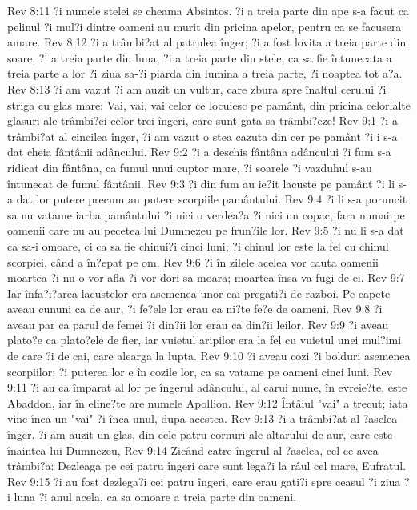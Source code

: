 Rev 8:11  ?i numele stelei se cheama Absintos. ?i a treia parte din ape s-a facut ca pelinul ?i mul?i dintre oameni au murit din pricina apelor, pentru ca se facusera amare.
Rev 8:12  ?i a trâmbi?at al patrulea înger; ?i a fost lovita a treia parte din soare, ?i a treia parte din luna, ?i a treia parte din stele, ca sa fie întunecata a treia parte a lor ?i ziua sa-?i piarda din lumina a treia parte, ?i noaptea tot a?a.
Rev 8:13  ?i am vazut ?i am auzit un vultur, care zbura spre înaltul cerului ?i striga cu glas mare: Vai, vai, vai celor ce locuiesc pe pamânt, din pricina celorlalte glasuri ale trâmbi?ei celor trei îngeri, care sunt gata sa trâmbi?eze!
Rev 9:1  ?i a trâmbi?at al cincilea înger, ?i am vazut o stea cazuta din cer pe pamânt ?i i s-a dat cheia fântânii adâncului.
Rev 9:2  ?i a deschis fântâna adâncului ?i fum s-a ridicat din fântâna, ca fumul unui cuptor mare, ?i soarele ?i vazduhul s-au întunecat de fumul fântânii.
Rev 9:3  ?i din fum au ie?it lacuste pe pamânt ?i li s-a dat lor putere precum au putere scorpiile pamântului.
Rev 9:4  ?i li s-a poruncit sa nu vatame iarba pamântului ?i nici o verdea?a ?i nici un copac, fara numai pe oamenii care nu au pecetea lui Dumnezeu pe frun?ile lor.
Rev 9:5  ?i nu li s-a dat ca sa-i omoare, ci ca sa fie chinui?i cinci luni; ?i chinul lor este la fel cu chinul scorpiei, când a în?epat pe om.
Rev 9:6  ?i în zilele acelea vor cauta oamenii moartea ?i nu o vor afla ?i vor dori sa moara; moartea însa va fugi de ei.
Rev 9:7  Iar înfa?i?area lacustelor era asemenea unor cai pregati?i de razboi. Pe capete aveau cununi ca de aur, ?i fe?ele lor erau ca ni?te fe?e de oameni.
Rev 9:8  ?i aveau par ca parul de femei ?i din?ii lor erau ca din?ii leilor.
Rev 9:9  ?i aveau plato?e ca plato?ele de fier, iar vuietul aripilor era la fel cu vuietul unei mul?imi de care ?i de cai, care alearga la lupta.
Rev 9:10  ?i aveau cozi ?i bolduri asemenea scorpiilor; ?i puterea lor e în cozile lor, ca sa vatame pe oameni cinci luni.
Rev 9:11  ?i au ca împarat al lor pe îngerul adâncului, al carui nume, în evreie?te, este Abaddon, iar în eline?te are numele Apollion.
Rev 9:12  Întâiul "vai" a trecut; iata vine înca un "vai" ?i înca unul, dupa acestea.
Rev 9:13  ?i a trâmbi?at al ?aselea înger. ?i am auzit un glas, din cele patru cornuri ale altarului de aur, care este înaintea lui Dumnezeu,
Rev 9:14  Zicând catre îngerul al ?aselea, cel ce avea trâmbi?a: Dezleaga pe cei patru îngeri care sunt lega?i la râul cel mare, Eufratul.
Rev 9:15  ?i au fost dezlega?i cei patru îngeri, care erau gati?i spre ceasul ?i ziua ?i luna ?i anul acela, ca sa omoare a treia parte din oameni.
